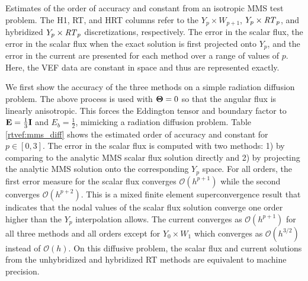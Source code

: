 \documentclass[../doc.tex]{subfiles}
\begin{document}
\begin{table}
\centering
\caption{Estimates of the order of accuracy and constant from an isotropic MMS test problem. The H1, RT, and HRT columns refer to the $Y_p\times W_{p+1}$, $Y_p\times \mathit{RT}_p$, and hybridized $Y_p\times \mathit{RT}_p$ discretizations, respectively. The error in the scalar flux, the error in the scalar flux when the exact solution is first projected onto $Y_p$, and the error in the current are presented for each method over a range of values of $p$. Here, the VEF data are constant in space and thus are represented exactly. }
\label{rtvef:mms_diff}

\end{table}
We first show the accuracy of the three methods on a simple radiation diffusion problem. The above process is used with $\boldsymbol{\mathrm{\Theta}} = 0$ so that the angular flux is linearly anisotropic. This forces the Eddington tensor and boundary factor to $\boldsymbol{\mathrm{E}} = \frac{1}{3}\boldsymbol{\mathrm{I}}$ and $E_b = \frac{1}{2}$, mimicking a radiation diffusion problem. Table \ref{rtvef:mms_diff} shows the estimated order of accuracy and constant for $p\in[0,3]$. The error in the scalar flux is computed with two methods: 1) by comparing to the analytic MMS scalar flux solution directly and 2) by projecting the analytic MMS solution onto the corresponding $Y_p$ space. For all orders, the first error measure for the scalar flux converges $\mathcal{O}(h^{p+1})$ while the second converges $\mathcal{O}(h^{p+2})$. This is a mixed finite element superconvergence result that indicates that the nodal values of the scalar flux solution converge one order higher than the $Y_p$ interpolation allows. The current converges as $\mathcal{O}(h^{p+1})$ for all three methods and all orders except for $Y_0 \times W_1$ which converges as $\mathcal{O}(h^{3/2})$ instead of $\mathcal{O}(h)$. On this diffusive problem, the scalar flux and current solutions from the unhybridized and hybridized RT methods are equivalent to machine precision. 
\end{document}
